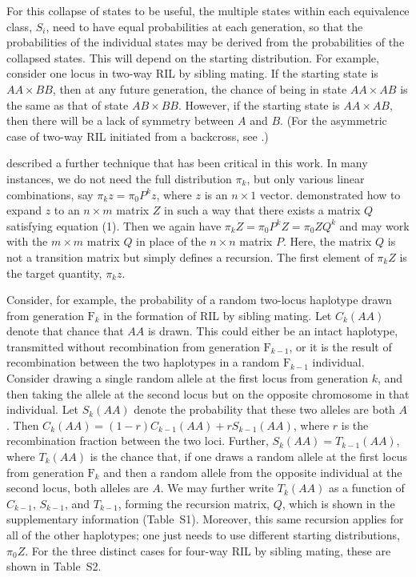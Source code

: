 \documentclass[12pt,letterpaper]{article}
\begin{document}
For this collapse of states to be useful, 
the multiple states within each
equivalence class, $S_i$, need to have equal probabilities at each
generation, so that the probabilities of the individual
states may be derived from the probabilities of the collapsed states.  This will
depend on the starting distribution.  For example, consider one locus
in two-way RIL by sibling mating.  If the starting state is $AA \times
BB$, then at any future generation, the chance of being in state $AA
\times AB$ is the same as that of state $AB \times BB$.  However, if
the starting state is $AA \times AB$, then there will be a lack of symmetry
between $A$ and $B$. (For the asymmetric case of two-way RIL initiated
from a backcross, see \citet{Johannes2011}.)

\citet{Kimura1963} described a further technique that has been
critical in this work.  In many instances, we do not need the full
distribution $\pi_k$, but only various linear combinations, say
$\pi_k z = \pi_0 P^k z$, where $z$ is an $n \times 1$ vector.
\citet{Kimura1963} demonstrated how to expand $z$ to an $n \times m$
matrix $Z$ in such a way that there exists a matrix $Q$ satisfying
equation (1).  Then we again have $\pi_k Z = \pi_0 P^k Z = \pi_0 Z
Q^k$ and may work with the $m \times m$ matrix $Q$ in place of the $n
\times n$ matrix $P$.  Here, the matrix $Q$ is not a transition matrix
but simply defines a recursion.  The first element of $\pi_k Z$ is the
target quantity, $\pi_k z$.

Consider, for example, the probability of a random two-locus haplotype
drawn from generation $\text{F}_k$ in the formation of RIL by sibling mating.
Let $C_k(AA)$ denote that chance that $AA$ is drawn.  This could
either be an intact haplotype, transmitted without recombination from
generation $\text{F}_{k-1}$, or it is the result of recombination
between the two haplotypes in a random $\text{F}_{k-1}$ individual.
Consider drawing a single random allele at the first locus from
generation $k$, and then taking the allele at the second locus but on
the opposite chromosome in that individual.  Let $S_k(AA)$ denote the
probability that these two alleles are both $A$.  Then $C_k(AA) =
(1-r)C_{k-1}(AA) + r S_{k-1}(AA)$, where $r$ is the recombination
fraction between the two loci.  Further, $S_k(AA) = T_{k-1}(AA)$,
where $T_k(AA)$ is the chance that, if one draws a random allele at the
first locus from generation $\text{F}_k$ and then a random allele from
the opposite individual at the second locus, both alleles are $A$.  We
may further write $T_k(AA)$ as a function of $C_{k-1}$, $S_{k-1}$,
and $T_{k-1}$, forming the recursion matrix, $Q$, which is shown in the
supplementary information (Table~S1).  Moreover, this same recursion
applies for all of the other haplotypes; one just needs to use different
starting distributions, $\pi_0 Z$.  For the three distinct cases for
four-way RIL by sibling mating, these are shown in Table~S2.
\end{document}
